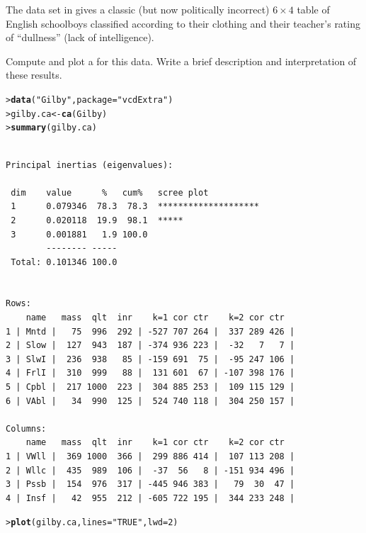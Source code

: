 \documentclass[10pt]{report}\usepackage[]{graphicx}\usepackage[]{color}
\makeatletter
\newcommand{\hlnum}[1]{\textcolor[rgb]{0.686,0.059,0.569}{#1}}%
\newcommand{\hlstr}[1]{\textcolor[rgb]{0.192,0.494,0.8}{#1}}%
\newcommand{\hlstd}[1]{\textcolor[rgb]{0.345,0.345,0.345}{#1}}%
\newcommand{\hlkwb}[1]{\textcolor[rgb]{0.69,0.353,0.396}{#1}}%
\newcommand{\hlkwc}[1]{\textcolor[rgb]{0.333,0.667,0.333}{#1}}%
\newcommand{\hlkwd}[1]{\textcolor[rgb]{0.737,0.353,0.396}{\textbf{#1}}}%
\newenvironment{kframe}{%
 \def\at@end@of@kframe{}%
 \ifinner\ifhmode%
  \def\at@end@of@kframe{\end{minipage}}%
  \begin{minipage}{\columnwidth}%
 \fi\fi%
 \def\FrameCommand##1{\hskip\@totalleftmargin \hskip-\fboxsep
 \colorbox{shadecolor}{##1}\hskip-\fboxsep
     \hskip-\linewidth \hskip-\@totalleftmargin \hskip\columnwidth}%
 \MakeFramed {\advance\hsize-\width
   \@totalleftmargin\z@ \linewidth\hsize
   \@setminipage}}%
 {\par\unskip\endMakeFramed%
 \at@end@of@kframe}
\newenvironment{knitrout}{}{} %
\renewenvironment{knitrout}{\small\renewcommand{\baselinestretch}{.85}}{} %
\makeatother
\begin{document}
\begin{Exercises}
  \exercise\label{lab:ca-gilby} The data set  in  gives a classic (but now politically incorrect)
  $6 \times 4$ table of English
  schoolboys classified according to their clothing and their teacher's rating of ``dullness'' (lack of intelligence).
  \begin{enumerate*}
    \item Compute and plot a \ca for this data.  Write a brief description and interpretation of these results.
    \begin{ans}
\begin{knitrout}\footnotesize
{}\color{fgcolor}\begin{kframe}
\begin{alltt}
\hlstd{> }\hlkwd{data}\hlstd{(}\hlstr{"Gilby"}\hlstd{,} \hlkwc{package}\hlstd{=}\hlstr{"vcdExtra"}\hlstd{)}
\hlstd{> }\hlstd{gilby.ca} \hlkwb{<-} \hlkwd{ca}\hlstd{(Gilby)}
\hlstd{> }\hlkwd{summary}\hlstd{(gilby.ca)}
\end{alltt}
\begin{verbatim}

Principal inertias (eigenvalues):

 dim    value      %   cum%   scree plot               
 1      0.079346  78.3  78.3  ********************     
 2      0.020118  19.9  98.1  *****                    
 3      0.001881   1.9 100.0                           
        -------- -----                                 
 Total: 0.101346 100.0                                 


Rows:
    name   mass  qlt  inr    k=1 cor ctr    k=2 cor ctr  
1 | Mntd |   75  996  292 | -527 707 264 |  337 289 426 |
2 | Slow |  127  943  187 | -374 936 223 |  -32   7   7 |
3 | SlwI |  236  938   85 | -159 691  75 |  -95 247 106 |
4 | FrlI |  310  999   88 |  131 601  67 | -107 398 176 |
5 | Cpbl |  217 1000  223 |  304 885 253 |  109 115 129 |
6 | VAbl |   34  990  125 |  524 740 118 |  304 250 157 |

Columns:
    name   mass  qlt  inr    k=1 cor ctr    k=2 cor ctr  
1 | VWll |  369 1000  366 |  299 886 414 |  107 113 208 |
2 | Wllc |  435  989  106 |  -37  56   8 | -151 934 496 |
3 | Pssb |  154  976  317 | -445 946 383 |   79  30  47 |
4 | Insf |   42  955  212 | -605 722 195 |  344 233 248 |
\end{verbatim}
\begin{alltt}
\hlstd{> }\hlkwd{plot}\hlstd{(gilby.ca,} \hlkwc{lines}\hlstd{=}\hlstr{"TRUE"}\hlstd{,} \hlkwc{lwd}\hlstd{=}\hlnum{2}\hlstd{)}
\end{alltt}
\end{kframe}


\end{knitrout}
\end{ans}
\end{enumerate*}
\end{Exercises}
\end{document}
